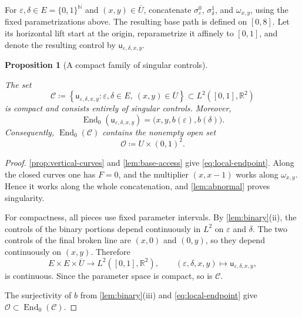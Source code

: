 \documentclass[11pt]{amsart}
\newtheorem{proposition}[theorem]{Proposition}
\numberwithin{equation}{section}
\theoremstyle{remark}
\newcommand{\R}{\mathbb R}
\newcommand{\End}{\operatorname{End}}
\begin{document}
For $\varepsilon,\delta\in E = \{0,1\}^{\mathbb{N}}$ and
$(x,y)\in\overline U$, concatenate $\sigma^0_\varepsilon$,
$\sigma^1_\delta$, and $\omega_{x,y}$, using the fixed parametrizations
above.  The resulting base path is defined on $[0,8]$.  Let its horizontal
lift start at the origin, reparametrize it affinely to $[0,1]$, and denote
the resulting control by $\mathsf{u}_{\varepsilon,\delta,x,y}$.
\begin{proposition}[A compact family of singular controls]\label{prop:compact-family}

The set
\begin{equation}
 \mathcal C\coloneq \left\{
  \mathsf{u}_{\varepsilon,\delta,x,y}:
  \varepsilon,\delta\in E,\ (x,y)\in\overline U
 \right\}
 \subset L^2([0,1],\R^2)
\end{equation}
is compact and consists entirely of singular controls.  Moreover,
\begin{equation}\label{eq:local-endpoint}
 \End_0(\mathsf{u}_{\varepsilon,\delta,x,y})
 =\bigl(x,y,b(\varepsilon),b(\delta)\bigr).
\end{equation}
Consequently, $\End_0(\mathcal C)$ contains the nonempty open set
\begin{equation}
 \mathcal O\coloneq U\times(0,1)^2.
\end{equation}
\end{proposition}

\begin{proof}
\cref{prop:vertical-curves} and \cref{lem:base-access}
give \eqref{eq:local-endpoint}.  Along the closed curves one has $F=0$,
and the multiplier $(x,x-1)$ works along $\omega_{x,y}$.  Hence it works
along the whole concatenation, and \cref{lem:abnormal} proves
singularity.

For compactness, all pieces use fixed parameter intervals.  By
\cref{lem:binary}\textup{(ii)}, the controls of the binary portions
depend continuously in $L^2$ on $\varepsilon$ and $\delta$.  The two
controls of the final broken line are $(x,0)$ and $(0,y)$, so they
depend continuously on $(x,y)$.  Therefore
\begin{equation}
 E\times E\times\overline U
 \longrightarrow L^2([0,1],\R^2),\qquad
 (\varepsilon,\delta,x,y)\longmapsto
 \mathsf{u}_{\varepsilon,\delta,x,y},
\end{equation}
is continuous.  Since the parameter space is compact, so is $\mathcal C$.

The surjectivity of $b$ from \cref{lem:binary}\textup{(iii)} and
\eqref{eq:local-endpoint} give
$\mathcal O\subset\End_0(\mathcal C)$.
\end{proof}
\end{document}
